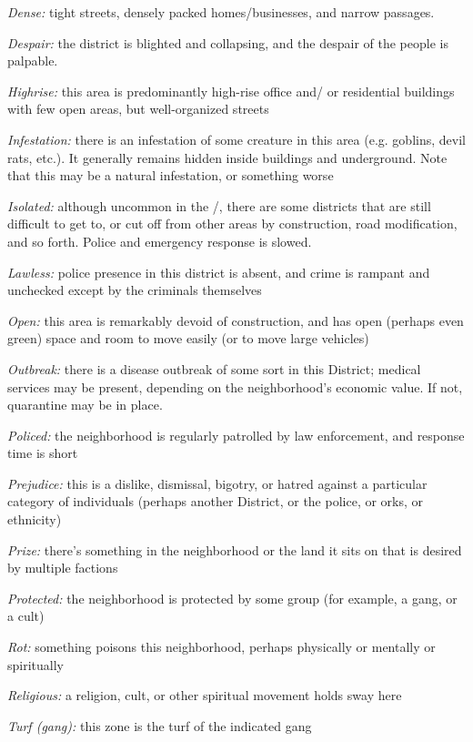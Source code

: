 \documentclass[oneside,10pt]{article}
\begin{document}
\begin{multicols}{2}
\begin{dent}
\textit{Dense:} tight streets, densely packed homes/businesses,
and narrow passages.

\textit{Despair:} the district is blighted and collapsing, and the despair of the people is palpable.

\textit{Highrise:} this area is predominantly high-rise office and/
or residential buildings with few open areas, but well-organized streets

\textit{Infestation:} there is an infestation of some creature in this
area (e.g. goblins, devil rats, etc.). It generally remains hidden inside buildings and underground. Note that this may
be a natural infestation, or something worse

\textit{Isolated:} although uncommon in the \SW/, there
are some districts that are still difficult to get to, or cut off
from other areas by construction, road modification, and so
forth. Police and emergency response is slowed.

\textit{Lawless:} police presence in this district is absent, and
crime is rampant and unchecked except by the criminals
themselves

\textit{Open:} this area is remarkably devoid of construction, and
has open (perhaps even green) space and room to move
easily (or to move large vehicles)

\textit{Outbreak:} there is a disease outbreak of some sort in this
District; medical services may be present, depending on
the neighborhood’s economic value. If not, quarantine
may be in place.

\textit{Policed:} the neighborhood is regularly patrolled by law enforcement, and response time is short

\textit{Prejudice:} this is a dislike, dismissal, bigotry, or hatred
against a particular category of individuals (perhaps another District, or the police, or orks, or ethnicity)

\textit{Prize:} there’s something in the neighborhood or the land it
sits on that is desired by multiple factions

\textit{Protected:} the neighborhood is protected by some group
(for example, a gang, or a cult)

\textit{Rot:} something poisons this neighborhood, perhaps physically or mentally or spiritually

\textit{Religious:} a religion, cult, or other spiritual movement
holds sway here

\textit{Turf (gang):} this zone is the turf of the indicated gang
\end{dent}

\end{multicols}
\end{document}
